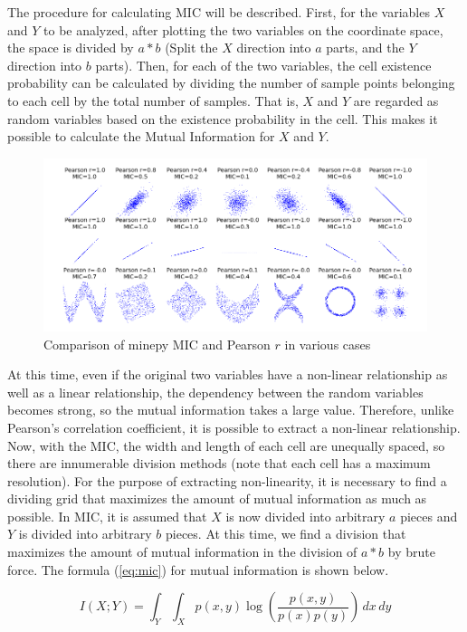 \documentclass[review]{elsarticle}
\begin{document}
The procedure for calculating MIC will be described. First, for the variables \(X\) and \(Y\) to be analyzed, after plotting the two variables on the coordinate space, the space is divided by \(a * b\) (Split the \(X\) direction into \(a\) parts, and the \(Y\) direction into \(b\) parts). Then, for each of the two variables, the cell existence probability can be calculated by dividing the number of sample points belonging to each cell by the total number of samples. That is, \(X\) and \(Y\) are regarded as random variables based on the existence probability in the cell. This makes it possible to calculate the Mutual Information for \(X\) and \(Y\).

\begin{figure}[bh]
\centering
\includegraphics[width=0.9\linewidth]{MIC_pearson_relationships.png}
\caption{Comparison of minepy MIC and Pearson \(r\) in various cases}
\label{fig:mic}
\end{figure}

At this time, even if the original two variables have a non-linear relationship as well as a linear relationship, the dependency between the random variables becomes strong, so the mutual information takes a large value. Therefore, unlike Pearson's correlation coefficient, it is possible to extract a non-linear relationship. Now, with the MIC, the width and length of each cell are unequally spaced, so there are innumerable division methods (note that each cell has a maximum resolution). For the purpose of extracting non-linearity, it is necessary to find a dividing grid that maximizes the amount of mutual information as much as possible. In MIC, it is assumed that \(X\) is now divided into arbitrary \(a\) pieces and \(Y\) is divided into arbitrary \(b\) pieces. At this time, we find a division that maximizes the amount of mutual information in the division of \(a * b\) by brute force. The formula (\ref{eq:mic}) for mutual information is shown below.

\begin{equation}\label{eq:mic}
I(X;Y) = \int_{Y}{\int_{X}{p(x,y)\log(\frac{p(x,y)}{p(x)p(y)})}\,dx}\,dy
\end{equation}
\end{document}

